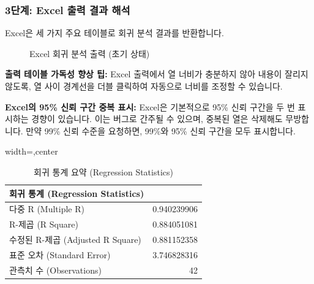 \documentclass[11pt,a4paper]{article}
\theoremstyle{definition}
\begin{document}
\subsubsection{3단계: Excel 출력 결과 해석}
Excel은 세 가지 주요 테이블로 회귀 분석 결과를 반환합니다.

\begin{figure}[h!]
    \centering
    \caption{Excel 회귀 분석 출력 (초기 상태)}
    \label{fig:downtime_output_raw}
\end{figure}

\begin{infobox}
\textbf{출력 테이블 가독성 향상 팁:}
Excel 출력에서 열 너비가 충분하지 않아 내용이 잘리지 않도록, 열 사이 경계선을 더블 클릭하여 자동으로 너비를 조정할 수 있습니다.
\end{infobox}

\begin{cautionbox}
\textbf{Excel의 95\% 신뢰 구간 중복 표시:}
Excel은 기본적으로 95\% 신뢰 구간을 두 번 표시하는 경향이 있습니다. 이는 버그로 간주될 수 있으며, 중복된 열은 삭제해도 무방합니다. 만약 99\% 신뢰 수준을 요청하면, 99\%와 95\% 신뢰 구간을 모두 표시합니다.
\end{cautionbox}

\begin{table}[h!]
    \centering
    \caption{회귀 통계 요약 (Regression Statistics)}
    \label{tab:excel_regression_stats}
    \begin{adjustbox}{width=\textwidth,center}
    \begin{tabular}{lr}
    \toprule
    \textbf{회귀 통계 (Regression Statistics)} & \\
    \midrule
    다중 R (Multiple R) & 0.940239906 \\
    R-제곱 (R Square) & 0.884051081 \\
    수정된 R-제곱 (Adjusted R Square) & 0.881152358 \\
    표준 오차 (Standard Error) & 3.746828316 \\
    관측치 수 (Observations) & 42 \\
    \bottomrule
    \end{tabular}
    \end{adjustbox}
\end{table}
\end{document}
